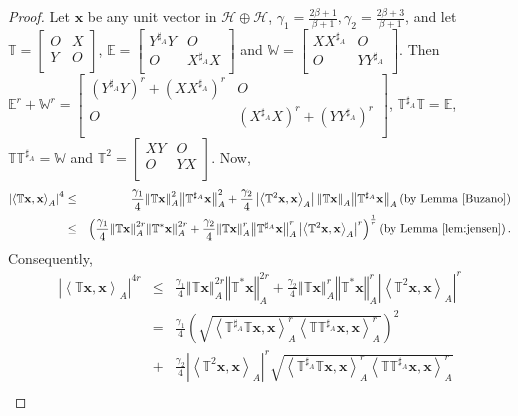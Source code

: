 \documentclass{article}
\newcommand{\bra}[1]{\left(#1\right)}
\newcommand{\seqA}[1]{{\left<#1\right>}_{A}}
\newcommand{\normA}[1]{{\left\Vert#1\right\Vert}_{A}}
\newcommand{\abs}[1]{\left\vert#1\right\vert}
\newcommand {\W}{\mathbb{W}}
\newcommand {\E}{\mathbb{E}}
\newcommand {\T}{\mathbb{T}}
\newcommand {\h}{\mathcal{H}}
\newcommand {\Ta}{\mathbb{T}^{\sharp_{A}}}
\newcommand {\Xa}{X^{\sharp_{A}}}
\newcommand {\Ya}{Y^{\sharp_{A}}}
\begin{document}
\begin{proof} Let $\mathbf{x}$ be any unit vector in $\h \oplus\h$, $\gamma_1=\frac{2\beta+1}{\beta+1}, \gamma_2=\frac{2\beta+3}{\beta+1}$, and let $\T=\begin{bmatrix} O& X\\ Y& O \\\end{bmatrix}$, $\E=\begin{bmatrix} \Ya Y& O\\ O& \Xa X \\\end{bmatrix}$ and $\W=\begin{bmatrix} X\Xa & O\\ O& Y\Ya \\\end{bmatrix}$.  Then $\E^r+\W^r=\begin{bmatrix} \bra{\Ya Y}^r+\bra{X\Xa}^r& O\\ O& \bra{\Xa X}^r+\bra{Y\Ya}^r \\\end{bmatrix}$, $\Ta \T=\E$, $\T\Ta=\W$
and $\T^2=\begin{bmatrix} XY& O\\ O& YX \\\end{bmatrix}$. Now,
\begin{eqnarray*}
  \abs{\seqA{\T\mathbf{x},\mathbf{x}}}^{4} &\leq& \frac{\gamma_1}{4}\normA{\T\mathbf{x}}^2\normA{\Ta\mathbf{x}}^2+
  \frac{\gamma_2}{4}\abs{\seqA{\T^2\mathbf{x},\mathbf{x}}}\normA{\T\mathbf{x}}\normA{\Ta\mathbf{x}}\bra{\mbox{by Lemma \ref{Buzano}}} \\
   &\leq&\bra{\frac{\gamma_1}{4}\normA{\T\mathbf{x}}^{2r}\normA{\T^*\mathbf{x}}^{2r}+
   \frac{\gamma_2}{4}\normA{\T\mathbf{x}}^{r}\normA{\Ta\mathbf{x}}^{r}\abs{\seqA{\T^2\mathbf{x},\mathbf{x}}}^r}^{\frac{1}{r}}\bra{\mbox{by Lemma \ref{lem:jensen}}}.
   \end{eqnarray*}
Consequently,
\begin{eqnarray*}
   \abs{\seqA{\T\mathbf{x},\mathbf{x}}}^{4r} &\leq& \frac{\gamma_1}{4}\normA{\T\mathbf{x}}^{2r}\normA{\T^*\mathbf{x}}^{2r}+
   \frac{\gamma_2}{4}\normA{\T\mathbf{x}}^{r}\normA{\T^*\mathbf{x}}^{r}\abs{\seqA{\T^2\mathbf{x},\mathbf{x}}}^r\\
  &=& \frac{\gamma_1}{4}\bra{\sqrt{\seqA{\Ta\T\mathbf{x},\mathbf{x}}^{r}\seqA{\T\Ta\mathbf{x},\mathbf{x}}^{r}}}^2\\
  &+&\frac{\gamma_2}{4}\abs{\seqA{\T^2\mathbf{x},\mathbf{x}}}^r\sqrt{\seqA{\Ta\T\mathbf{x},\mathbf{x}}^{r}\seqA{\T\Ta\mathbf{x},\mathbf{x}}^{r}}\\

\end{eqnarray*}
\end{proof}
\end{document}

